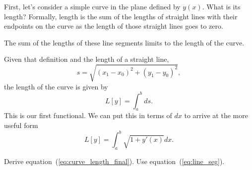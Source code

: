First, let's consider a simple curve in the plane defined by $y(x)$. What is its length? Formally, length is the sum of the lengths of straight lines with their endpoints on the curve as the length of those straight lines goes to zero. 
\begin{marginfigure}
  \caption{The sum of the lengths of these line segments limits to the length of the curve.}
\end{marginfigure}
Given that definition and the length of a straight line,
\begin{equation}
  \label{eq:line_seg}
  s = \sqrt{(x_1 - x_0)^2 + (y_1 - y_0)^2},  
\end{equation}
the length of the curve is given by
\begin{equation}
  \label{eq:curve_length_1}
  L[y] = \int_a^b ds.
\end{equation}
This is our first functional. We can put this in terms of $dx$ to arrive at the more useful form
\begin{equation}
  \label{eq:curve_length_final}
  L[y] = \int_a^b \sqrt{1 + y'(x)} dx.
\end{equation}

\begin{Exercise}
  Derive equation~(\ref{eq:curve_length_final}). Use equation~(\ref{eq:line_seg}).
\end{Exercise}

